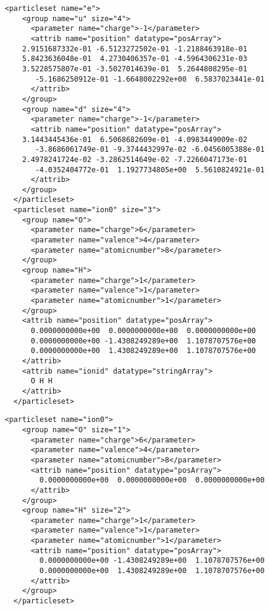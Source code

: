 \begin{minipage}{\linewidth}
\begin{lstlisting}[style=QMCPXML,caption=Particleset elements for ions and electrons specifying electron start positions.]
  <particleset name="e">
    <group name="u" size="4">
      <parameter name="charge">-1</parameter>
      <attrib name="position" datatype="posArray">
	2.9151687332e-01 -6.5123272502e-01 -1.2188463918e-01
	5.8423636048e-01  4.2730406357e-01 -4.5964306231e-03
	3.5228575807e-01 -3.5027014639e-01  5.2644808295e-01
       -5.1686250912e-01 -1.6648002292e+00  6.5837023441e-01
      </attrib>
    </group>
    <group name="d" size="4">
      <parameter name="charge">-1</parameter>
      <attrib name="position" datatype="posArray">
	3.1443445436e-01  6.5068682609e-01 -4.0983449009e-02
       -3.8686061749e-01 -9.3744432997e-02 -6.0456005388e-01
	2.4978241724e-02 -3.2862514649e-02 -7.2266047173e-01
       -4.0352404772e-01  1.1927734805e+00  5.5610824921e-01
      </attrib>
    </group>
  </particleset>
  <particleset name="ion0" size="3">
    <group name="O">
      <parameter name="charge">6</parameter>
      <parameter name="valence">4</parameter>
      <parameter name="atomicnumber">8</parameter>
    </group>
    <group name="H">
      <parameter name="charge">1</parameter>
      <parameter name="valence">1</parameter>
      <parameter name="atomicnumber">1</parameter>
    </group>
    <attrib name="position" datatype="posArray">
      0.0000000000e+00  0.0000000000e+00  0.0000000000e+00
      0.0000000000e+00 -1.4308249289e+00  1.1078707576e+00
      0.0000000000e+00  1.4308249289e+00  1.1078707576e+00
    </attrib>
    <attrib name="ionid" datatype="stringArray">
      O H H 
    </attrib>
  </particleset>
\end{lstlisting}
\end{minipage}

\begin{minipage}{\linewidth}
\begin{lstlisting}[style=QMCPXML,caption=Particleset elements for ions specifying positions by ion type.]
  <particleset name="ion0">
    <group name="O" size="1">
      <parameter name="charge">6</parameter>
      <parameter name="valence">4</parameter>
      <parameter name="atomicnumber">8</parameter>
      <attrib name="position" datatype="posArray">
        0.0000000000e+00  0.0000000000e+00  0.0000000000e+00
      </attrib>
    </group>
    <group name="H" size="2">
      <parameter name="charge">1</parameter>
      <parameter name="valence">1</parameter>
      <parameter name="atomicnumber">1</parameter>
      <attrib name="position" datatype="posArray">
        0.0000000000e+00 -1.4308249289e+00  1.1078707576e+00
        0.0000000000e+00  1.4308249289e+00  1.1078707576e+00
      </attrib>
    </group>
  </particleset>
\end{lstlisting}
\end{minipage}
